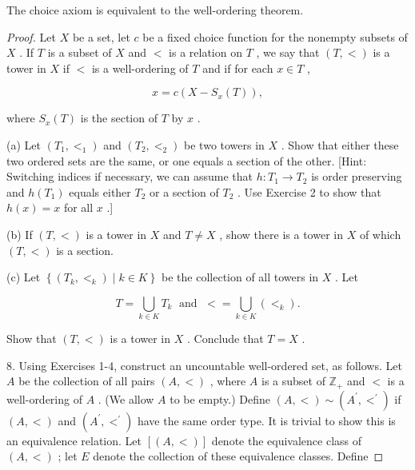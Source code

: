 \begin{theorem} The choice axiom is equivalent to the well-ordering theorem.
\end{theorem}
\begin{proof} Let \(X\) be a set, let \(c\) be a fixed choice function for the nonempty subsets of \(X\) . If \(T\) is a subset of \(X\) and \(<\) is a relation on \(T\) , we say that \(\left( {T, < }\right)\) is a tower in \(X\) if \(<\) is a well-ordering of \(T\) and if for each \(x \in  T\) ,

\[
x = c\left( {X - {S}_{x}\left( T\right) }\right) ,
\]

where \({S}_{x}\left( T\right)\) is the section of \(T\) by \(x\) .

(a) Let \(\left( {{T}_{1},{ < }_{1}}\right)\) and \(\left( {{T}_{2},{ < }_{2}}\right)\) be two towers in \(X\) . Show that either these two ordered sets are the same, or one equals a section of the other. [Hint: Switching indices if necessary, we can assume that \(h : {T}_{1} \rightarrow  {T}_{2}\) is order preserving and \(h\left( {T}_{1}\right)\) equals either \({T}_{2}\) or a section of \({T}_{2}\) . Use Exercise 2 to show that \(h\left( x\right)  = x\) for all \(x\) .]

(b) If \(\left( {T, < }\right)\) is a tower in \(X\) and \(T \neq  X\) , show there is a tower in \(X\) of which \(\left( {T, < }\right)\) is a section.

(c) Let \(\left\{  {\left( {{T}_{k},{ < }_{k}}\right)  \mid  k \in  K}\right\}\) be the collection of all towers in \(X\) . Let

\[
T = \mathop{\bigcup }\limits_{{k \in  K}}{T}_{k}\;\text{ and }\; <  = \mathop{\bigcup }\limits_{{k \in  K}}\left( { < }_{k}\right) .
\]

Show that \(\left( {T, < }\right)\) is a tower in \(X\) . Conclude that \(T = X\) .

8. Using Exercises 1-4, construct an uncountable well-ordered set, as follows. Let \(A\) be the collection of all pairs \(\left( {A, < }\right)\) , where \(A\) is a subset of \({\mathbb{Z}}_{ + }\) and \(<\) is a well-ordering of \(A\) . (We allow \(A\) to be empty.) Define \(\left( {A, < }\right)  \sim  \left( {{A}^{\prime },{ < }^{\prime }}\right)\) if \(\left( {A, < }\right)\) and \(\left( {{A}^{\prime },{ < }^{\prime }}\right)\) have the same order type. It is trivial to show this is an equivalence relation. Let \(\left\lbrack  \left( {A, < }\right) \right\rbrack\) denote the equivalence class of \(\left( {A, < }\right)\) ; let \(E\) denote the collection of these equivalence classes. Define


\end{proof}
